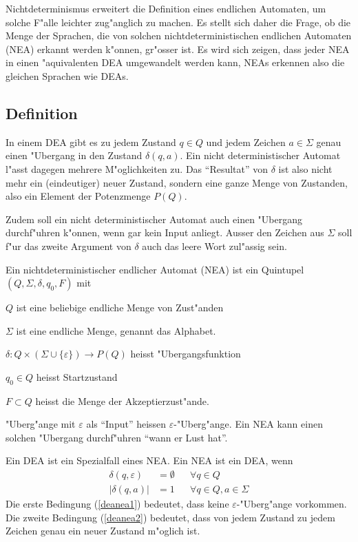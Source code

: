 Nichtdeterminismus erweitert 
die Definition eines endlichen Automaten, um solche F"alle leichter 
zug"anglich zu machen. Es stellt sich daher die Frage, ob die Menge 
der Sprachen, die von solchen nichtdeterministischen endlichen Automaten (NEA)
erkannt werden k"onnen,
gr"osser ist. Es wird sich zeigen, dass jeder NEA
in einen "aquivalenten DEA umgewandelt werden kann, NEAs erkennen also
die gleichen Sprachen wie DEAs.

\subsection{Definition\label{regulaer:definition-dea}}
In einem DEA gibt es zu jedem Zustand $q\in Q$
und jedem Zeichen $a\in\Sigma$ genau
einen "Ubergang in den Zustand $\delta(q,a)$.
Ein nicht deterministischer
Automat l"asst dagegen mehrere M"oglichkeiten zu. Das ``Resultat''
von $\delta$ ist also nicht mehr ein (eindeutiger) neuer Zustand, sondern
eine ganze Menge von Zustanden, also ein Element der Potenzmenge $P(Q)$.

Zudem soll ein
nicht deterministischer Automat auch einen "Ubergang durchf"uhren
k"onnen, wenn gar kein Input anliegt.
Ausser den Zeichen aus $\Sigma$ soll f"ur das zweite Argument
von $\delta$ auch das leere Wort zul"assig sein.

\begin{definition}\label{definition_nea}
Ein nichtdeterministischer endlicher Automat (NEA) ist ein Quintupel
$(Q,\Sigma,\delta, q_0,F)$ mit
\begin{compactenum}
\item $Q$ ist eine beliebige endliche Menge von Zust"anden
\item $\Sigma$ ist eine endliche Menge, genannt das Alphabet.
\item $\delta\colon Q\times(\Sigma\cup\{\varepsilon\})\to P(Q)$ heisst "Ubergangsfunktion
\item $q_0\in Q$ heisst Startzustand
\item $F\subset Q$ heisst die Menge der Akzeptierzust"ande.
\end{compactenum}
\end{definition}
"Uberg"ange mit $\varepsilon$ als ``Input'' heissen $\varepsilon$-"Uberg"ange.
Ein NEA kann einen solchen "Ubergang durchf"uhren ``wann er Lust hat''.

Ein DEA ist ein Spezialfall eines NEA. Ein NEA ist
ein DEA, wenn
\begin{align}
\delta(q,\varepsilon)&=\emptyset&&\forall q\in Q\label{deanea1}\\
|\delta(q,a)|&=1&&\forall q\in Q, a\in\Sigma\label{deanea2}
\end{align}
Die erste Bedingung (\ref{deanea1}) bedeutet, dass keine
$\varepsilon$-"Uberg"ange vorkommen. Die zweite Bedingung (\ref{deanea2})
bedeutet, dass von jedem Zustand zu jedem Zeichen genau ein
neuer Zustand m"oglich ist.

